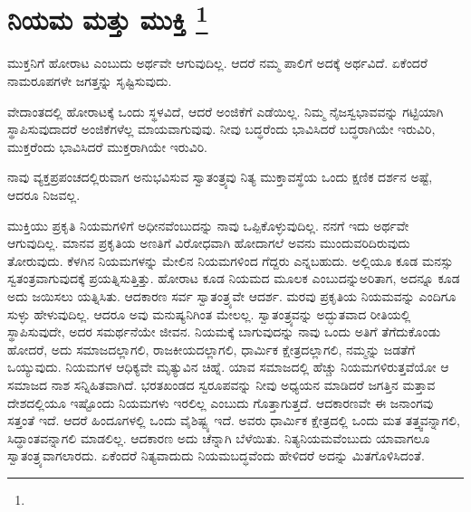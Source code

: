 
\vspace{-0.6cm}

\chapter[ನಿಯಮ ಮತ್ತು ಮುಕ್ತಿ ]{ನಿಯಮ ಮತ್ತು ಮುಕ್ತಿ \protect\footnote{}}

ಮುಕ್ತನಿಗೆ ಹೋರಾಟ ಎಂಬುದು ಅರ್ಥವೇ ಆಗುವುದಿಲ್ಲ. ಆದರೆ ನಮ್ಮ ಪಾಲಿಗೆ ಅದಕ್ಕೆ ಅರ್ಥವಿದೆ. ಏಕೆಂದರೆ ನಾಮರೂಪಗಳೇ ಜಗತ್ತನ್ನು ಸೃಷ್ಟಿಸುವುದು.

ವೇದಾಂತದಲ್ಲಿ ಹೋರಾಟಕ್ಕೆ ಒಂದು ಸ್ಥಳವಿದೆ, ಆದರೆ ಅಂಜಿಕೆಗೆ ಎಡೆಯಿಲ್ಲ. ನಿಮ್ಮ ನೈಜಸ್ವಭಾವವನ್ನು ಗಟ್ಟಿಯಾಗಿ ಸ್ಥಾಪಿಸುವುದಾದರೆ ಅಂಜಿಕೆಗಳೆಲ್ಲ ಮಾಯವಾಗುವುವು. ನೀವು ಬದ್ಧರೆಂದು ಭಾವಿಸಿದರೆ ಬದ್ಧರಾಗಿಯೇ ಇರುವಿರಿ, ಮುಕ್ತರೆಂದು ಭಾವಿಸಿದರೆ ಮುಕ್ತರಾಗಿಯೇ ಇರುವಿರಿ.

ನಾವು ವ್ಯಕ್ತಪ್ರಪಂಚದಲ್ಲಿರುವಾಗ ಅನುಭವಿಸುವ ಸ್ವಾತಂತ್ರ್ಯವು ನಿತ್ಯ ಮುಕ್ತಾವಸ್ಥೆಯ ಒಂದು ಕ್ಷಣಿಕ ದರ್ಶನ ಅಷ್ಟೆ, ಆದರೂ ನಿಜವಲ್ಲ.

ಮುಕ್ತಿಯು ಪ್ರಕೃತಿ ನಿಯಮಗಳಿಗೆ ಅಧೀನವೆಂಬುದನ್ನು ನಾವು ಒಪ್ಪಿಕೊಳ್ಳುವುದಿಲ್ಲ. ನನಗೆ ಇದು ಅರ್ಥವೇ ಆಗುವುದಿಲ್ಲ. ಮಾನವ ಪ್ರಕೃತಿಯ ಅಣತಿಗೆ ವಿರೋಧವಾಗಿ ಹೋದಾಗಲೆ ಅವನು ಮುಂದುವರಿದಿರುವುದು ತೋರುವುದು. ಕೆಳಗಿನ ನಿಯಮಗಳನ್ನು ಮೇಲಿನ ನಿಯಮಗಳಿಂದ ಗೆದ್ದರು ಎನ್ನಬಹುದು. ಅಲ್ಲಿಯೂ ಕೂಡ ಮನಸ್ಸು ಸ್ವತಂತ್ರವಾಗುವುದಕ್ಕೆ ಪ್ರಯತ್ನಿಸುತ್ತಿತ್ತು. ಹೋರಾಟ ಕೂಡ ನಿಯಮದ ಮೂಲಕ ಎಂಬುದನ್ನು\break ಅರಿತಾಗ, ಅದನ್ನೂ ಕೂಡ ಅದು ಜಯಿಸಲು ಯತ್ನಿಸಿತು. ಆದಕಾರಣ ಸರ್ವ ಸ್ವಾತಂತ್ರ್ಯವೇ ಆದರ್ಶ. ಮರವು ಪ್ರಕೃತಿಯ ನಿಯಮವನ್ನು ಎಂದಿಗೂ ಸುಳ್ಳು ಹೇಳುವುದಿಲ್ಲ. ಆದರೂ ಅವು ಮನುಷ್ಯನಿಗಿಂತ ಮೇಲಲ್ಲ. ಸ್ವಾತಂತ್ರ್ಯವನ್ನು ಅದ್ಭುತವಾದ ರೀತಿಯಲ್ಲಿ ಸ್ಥಾಪಿಸುವುದೇ, ಅದರ ಸಮರ್ಥನೆಯೇ ಜೀವನ. ನಿಯಮಕ್ಕೆ ಬಾಗುವುದನ್ನು ನಾವು ಒಂದು ಅತಿಗೆ ತೆಗೆದುಕೊಂಡು ಹೋದರೆ, ಅದು ಸಮಾಜದಲ್ಲಾಗಲಿ, ರಾಜಕೀಯದಲ್ಲಾಗಲಿ, ಧಾರ್ಮಿಕ ಕ್ಷೇತ್ರದಲ್ಲಾಗಲಿ, ನಮ್ಮನ್ನು ಜಡತೆಗೆ ಒಯ್ಯುವುದು. ನಿಯಮಗಳ ಆಧಿಕ್ಯವೇ ಮೃತ್ಯುವಿನ ಚಿಹ್ನೆ. ಯಾವ ಸಮಾಜದಲ್ಲಿ ಹೆಚ್ಚು ನಿಯಮಗಳಿರುತ್ತವೆಯೋ ಆ ಸಮಾಜದ ನಾಶ ಸನ್ನಿಹಿತವಾಗಿದೆ. ಭರತಖಂಡದ ಸ್ವರೂಪವನ್ನು ನೀವು ಅಧ್ಯಯನ ಮಾಡಿದರೆ ಜಗತ್ತಿನ ಮತ್ತಾವ ದೇಶದಲ್ಲಿಯೂ ಇಷ್ಟೊಂದು ನಿಯಮಗಳು ಇರಲಿಲ್ಲ ಎಂಬುದು ಗೊತ್ತಾಗುತ್ತದೆ. ಆದಕಾರಣವೇ ಈ ಜನಾಂಗವು ಸತ್ತಂತೆ ಇದೆ. ಆದರೆ ಹಿಂದೂಗಳಲ್ಲಿ ಒಂದು ವೈಶಿಷ್ಟ್ಯ ಇದೆ. ಅವರು ಧಾರ್ಮಿಕ ಕ್ಷೇತ್ರದಲ್ಲಿ ಒಂದು ಮತ ತತ್ತ್ವವನ್ನಾಗಲಿ, ಸಿದ್ಧಾಂತವನ್ನಾಗಲಿ ಮಾಡಲಿಲ್ಲ. ಆದಕಾರಣ ಅದು ಚೆನ್ನಾಗಿ ಬೆಳೆಯಿತು. ನಿತ್ಯನಿಯಮವೆಂಬುದು ಯಾವಾಗಲೂ ಸ್ವಾತಂತ್ರ್ಯವಾಗಲಾರದು. ಏಕೆಂದರೆ ನಿತ್ಯವಾದುದು ನಿಯಮಬದ್ಧವೆಂದು ಹೇಳಿದರೆ ಅದನ್ನು ಮಿತಗೊಳಿಸಿದಂತೆ.

